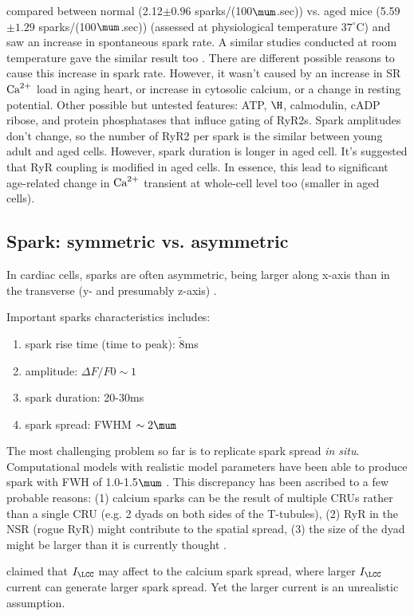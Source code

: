 \citep{howlett2006} compared between normal (2.12$\pm 0.96$
sparks/(100$\mum$.sec)) vs. aged mice (5.59$\pm 1.29$ sparks/(100$\mum$.sec))
(assessed at physiological temperature $37^\circ$C) and saw an increase in
spontaneous spark rate. A similar studies conducted at room temperature gave the
similar result too \citep{zhu2005}. There are different possible reasons to
cause this increase in spark rate. However, it wasn't caused by an increase in
SR ${\text{Ca}^{2+}}$ load in aging heart, or increase in cytosolic calcium, or a change in
resting potential. Other possible but untested features: ATP, $\H$, calmodulin,
cADP ribose, and protein phosphatases that influce gating of RyR2s.
Spark amplitudes don't change, so the number of RyR2 per spark is the similar
between young adult and aged cells. However, spark duration is longer in aged
cell. It's suggested that RyR coupling is modified in aged cells. In essence,
this lead to significant age-related change in ${\text{Ca}^{2+}}$ transient at whole-cell
level too (smaller in aged cells).


\subsection{Spark: symmetric vs. asymmetric}

In cardiac cells, sparks are often asymmetric, being larger along x-axis than in
the transverse (y- and presumably z-axis) \citep{parker1996csi}. 

Important sparks characteristics includes:
\begin{enumerate}
  \item spark rise time (time to peak): $\tilde 8$ms
  \item amplitude: $\Delta F/F0 \sim 1$
  \item spark duration: 20-30ms
  \item spark spread: FWHM $\sim 2\mum$
\end{enumerate}
The most challenging problem so far is to replicate spark spread {\it in
situ}. Computational models with realistic model parameters have been able to
produce spark with FWH of 1.0-1.5$\mum$ \citep{smith1998, sobie2002tcas}.
This discrepancy has been ascribed to a few probable reasons: (1) calcium sparks
can be the result of multiple CRUs rather than a single CRU (e.g. 2 dyads on
both sides of the T-tubules), (2) RyR in the NSR (rogue RyR) might contribute to
the spatial spread, (3) the size of the dyad might be larger than it is
currently thought \citep{soeller2004}. 

\citep{izu2001lcg} claimed that $I_\LCC$ may affect to the calcium spark spread,
where larger $I_\LCC$ current can generate larger spark spread. Yet the larger
current is an unrealistic assumption. 



